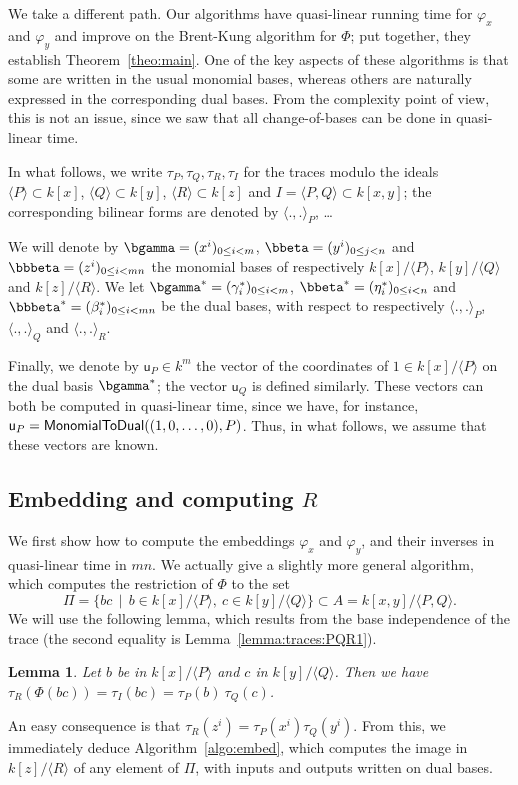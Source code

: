 \documentclass{sig-alternate}
\def\vu {\ensuremath{\mathsf{u}}}
\newcounter{algo}
\newcommand{\ang}[1]{\langle#1\rangle}
\newtheorem{Lemma}{Lemma}
\begin{document}
We take a different path. Our algorithms have quasi-linear running
time for $\varphi_x$ and $\varphi_y$ and improve on the Brent-Kung
algorithm for $\Phi$; put together, they establish
Theorem~\ref{theo:main}. One of the key aspects of these algorithms is
that some are written in the usual monomial bases, whereas others are
naturally expressed in the corresponding dual bases. From the
complexity point of view, this is not an issue, since we saw that all
change-of-bases can be done in quasi-linear time.

In what follows, we write $\tau_P,\tau_Q,\tau_R,\tau_I$ for the traces
modulo the ideals $\ang{P}\subset k[x]$, $\ang{Q} \subset k[y]$,
$\ang{R} \subset k[z]$ and $I=\ang{P,Q} \subset k[x,y]$; the
corresponding bilinear forms are denoted by $\ang{.,.}_P$, \dots

We will denote by $\bgamma=(x^i)_{0 \le i < m}$, $\bbeta=(y^i)_{0 \le
  j < n}$ and $\bbbeta = (z^i)_{0 \le i < mn}$ the monomial bases of
respectively $k[x]/\ang{P}$, $k[y]/\ang{Q}$ and $k[z]/\ang{R}$. We let
$\bgamma^\ast=(\gamma^\ast_i)_{0 \le i <m}$,
$\bbeta^\ast=(\eta^\ast_i)_{0 \le i < n}$ and
$\bbbeta^\ast=(\beta^\ast_i)_{0 \le i < mn}$ be the dual bases, with
respect to respectively $\ang{.,.}_P$, $\ang{.,.}_Q$ and
$\ang{.,.}_R$.

Finally, we denote by $\vu_P \in k^m$ the vector of the coordinates of
$1 \in k[x]/\ang{P}$ on the dual basis $\bgamma^\ast$; the vector
$\vu_Q$ is defined similarly. These vectors can both be computed in
quasi-linear time, since we have, for instance, $\vu_P = {\sf
  MonomialToDual}((1,0,\dots,0), P)$. Thus, in what follows, we assume
that these vectors are known.


\subsection{Embedding and computing $R$} 

We first show how to compute the embeddings $\varphi_x$ and
$\varphi_y$, and their inverses in quasi-linear time in $mn$. We
actually give a slightly more general algorithm, which computes the
restriction of $\Phi$ to the set $$\Pi= \{bc \,\mid\, b\in
k[x]/\ang{P},\ c\in k[y]/\ang{Q}\} \subset A=k[x,y]/\ang{P,Q}.$$ We
will use the following lemma, which results from the base independence
of the trace (the second equality is Lemma~\ref{lemma:traces:PQR1}).
\begin{Lemma}
  \label{lemma:traces:PQR}
  Let $b$ be in $k[x]/\ang{P}$ and $c$ in $k[y]/\ang{Q}$. Then we have
  $\tau_R(\Phi(bc)) = \tau_I(bc) = \tau_P(b) \ \tau_Q(c)$.
\end{Lemma}
An easy consequence is that $\tau_R(z^i) =
\tau_P(x^i)\tau_Q(y^i)$. From this, we immediately deduce
Algorithm~\ref{algo:embed}, which computes the image in $k[z]/\ang{R}$
of any element of $\Pi$, with inputs and outputs written on dual
bases.
\end{document}
